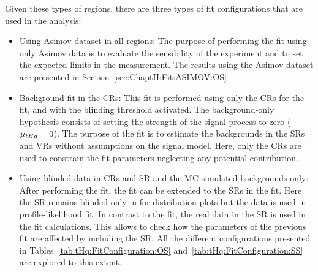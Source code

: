 Given these types of regions, there are three types of fit configurations that are used in the analysis:
\begin{itemize}
	\item Using Asimov dataset in all regions:
		The purpose of performing the fit using only Asimov data is to evaluate the sensibility
		of the experiment and to set the expected limits in the measurement.
		The results using the Asimov dataset are presented in Section~\ref{sec:ChaptH:Fit:ASIMOV:OS}
		
	\item Background fit in the CRs:
		This fit is performed using only the CRs for the fit, and with the blinding threshold activated.
		The background-only hypothesis consists of setting the strength of the signal 
		process to zero ($\mu_{tHq}=0$). %
		The purpose of the  fit is to estimate the backgrounds in
		the SRs and VRs without assumptions on the signal model. 
		Here, only the CRs are used to constrain the fit parameters neglecting any potential \tHq contribution.

	\item Using blinded data in CRs and SR and the MC-simulated backgrounds only: 
		After performing the  fit, the fit can be extended to the
		SRs in the  fit. Here the SR remains blinded
		only in for distribution plots but the data is used in profile-likelihood fit. 
		In contrast to the  fit, the
		real data in the SR is used in the fit calculations. This allows to check how the parameters
		of the previous fit are affected by including the SR.
		All the different configurations presented in Tables~\ref{tab:tHq:FitConfiguration:OS}
		and~\ref{tab:tHq:FitConfiguration:SS} are explored to this extent.


\end{itemize}
